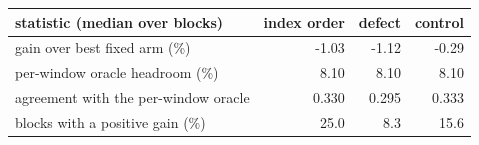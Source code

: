 \begin{tabular}{lrrr}
\toprule
statistic (median over blocks) & index order & defect & control \\
\midrule
gain over best fixed arm (\%) & -1.03 & -1.12 & -0.29 \\
per-window oracle headroom (\%) & 8.10 & 8.10 & 8.10 \\
agreement with the per-window oracle & 0.330 & 0.295 & 0.333 \\
blocks with a positive gain (\%) & 25.0 & 8.3 & 15.6 \\
\bottomrule
\end{tabular}